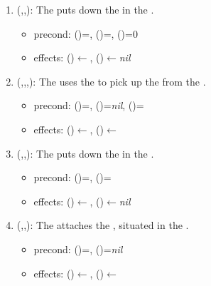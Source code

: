\begin{enumerate}
\item {}(,,): The   puts down the   in the  .
    \begin{itemize}
        \item precond: ()=, ()=, ()=0
        \item effects: ()$\leftarrow$, ()$\leftarrow$\textit{nil}
    \end{itemize}    

\item {}(,,,): The   uses the   to pick up the   from the  .
    \begin{itemize}
        \item precond: ()=, ()=\textit{nil}, ()=
        \item effects: ()$\leftarrow$, ()$\leftarrow$
    \end{itemize}   

\item {}(,,): The   puts down the   in the  .
    \begin{itemize}
        \item precond: ()=, ()=
        \item effects: ()$\leftarrow$, ()$\leftarrow$\textit{nil}
    \end{itemize}   

\item {}(,,): The   attaches the  , situated in the  .
    \begin{itemize}
        \item precond: ()=, ()=\textit{nil}
        \item effects: ()$\leftarrow$, ()$\leftarrow$
    \end{itemize}    


\end{enumerate}
